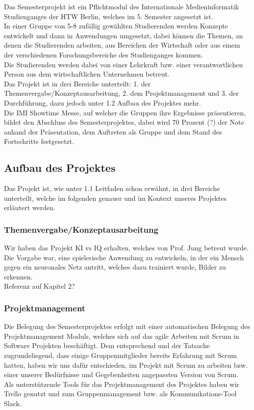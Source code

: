 \documentclass[11pt]{article}
\begin{document}
Das Semesterprojekt ist ein Pflichtmodul des Internationale Medieninformatik Studienganges der HTW Berlin, welches im 5. Semester angesetzt ist. \\
In einer Gruppe von 5-8 zufällig gewählten Studierenden werden Konzepte entwickelt und dann in Anwendungen umgesetzt, dabei können die Themen, an denen die Studierenden arbeiten, aus Bereichen der Wirtschaft oder aus einem der verschiedenen Forschungsbereiche des Studienganges kommen. \\
Die Studierenden werden dabei von einer Lehrkraft bzw. einer verantwortlichen Person aus dem wirtschaftlichen Unternehmen betreut.\\
Das Projekt ist in drei Bereiche unterteilt: 1. der Themenvergabe/Konzeptausarbeitung, 2. dem Projektmanagement und 3. der Durchführung, dazu jedoch unter 1.2 Aufbau des Projektes mehr.\\
Die IMI Showtime Messe, auf welcher die Gruppen ihre Ergebnisse präsentieren, bildet den Abschluss des Semesterprojektes, dabei wird 70 Prozent (?) der Note anhand der Präsentation, dem Auftreten als Gruppe und dem Stand des Fortschritts festgesetzt.
\subsection{Aufbau des Projektes}

    
Das Projekt ist, wie unter 1.1 Leitfaden schon erwähnt, in drei Bereiche unterteilt, welche im folgenden genauer und im Kontext unseres Projektes erläutert werden.

\subsubsection{ Themenvergabe/Konzeptausarbeitung }
Wir haben das Projekt KI vs IQ erhalten, welches von Prof. Jung 		betreut wurde.\\
Die Vorgabe war, eine spielerische Anwendung zu entwickeln, 			in der ein Mensch gegen ein neuronales Netz antritt, welches 			dazu trainiert wurde, Bilder zu erkennen.\\
Referenz auf Kapitel 2?
	
\subsubsection{  Projektmanagement }
Die Belegung des Semesterprojektes erfolgt mit einer 						automatischen Belegung des Projektmanagement Moduls, 				welches sich auf das agile Arbeiten mit Scrum in Software 				Projekten beschäftigt. Dem entsprechend und der Tatsache 				zugrundeliegend, dass einige Gruppenmitglieder bereits 					Erfahrung mit Scrum hatten, haben wir uns dafür entschieden, im 	Projekt mit Scrum zu arbeiten bzw. einer unserer 						Bedürfnisse und Gegebenheiten angepassten Version von 				Scrum.\\
Als unterstützende Tools für das Projektmanagement des Projektes haben wir 	Trello genutzt und zum Gruppenmanagement bzw. als 		Kommunikations-Tool Slack.
\end{document}
